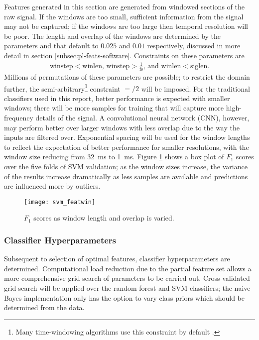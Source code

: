             Features generated in this section are generated from windowed sections of the raw signal. If the windows are too small, sufficient information from the signal may not be captured; if the windows are too large then temporal resolution will be poor. The length and overlap of the windows are determined by the parameters  and  that default to $0.025$ and $0.01$ respectively, discussed in more detail in section \ref{subsec:pl-feats-software}. Constraints on these parameters are 
            \begin{align}
                \text{winstep} < \text{winlen, winstep} > \frac{1}{\text{fs}} \text{, and winlen} < \text{siglen}.
            \end{align}
            Millions of permutations of these parameters are possible; to restrict the domain further, the semi-arbitrary\footnote{Many time-windowing algorithms use this constraint by default \cite{MathWorks,Octave}.} constraint $=$$/2$ will be imposed. For the traditional classifiers used in this report, better performance is expected with smaller windows; there will be more samples for training that will capture more high-frequency details of the signal. A convolutional neural network (CNN), however, may perform better over larger windows with less overlap \cite{Han} due to the way the inputs are filtered over. Exponential spacing will be used for the window lengths to reflect the expectation of better performance for smaller resolutions, with the window size reducing from \SI{32}{\milli\second} to \SI{1}{\milli\second}. Figure \ref{fig:exp-clf-opt-svmfeatwin} shows a box plot of $F_{1}$ scores over the five folds of SVM validation; as the window sizes increase, the variance of the results increase dramatically as less samples are available and predictions are influenced more by outliers. 
            
            \begin{figure}[ht]
                \centering
                \texttt{[image: svm\_featwin]}
                \caption{$F_{1}$ scores as window length and overlap is varied.}
                \label{fig:exp-clf-opt-svmfeatwin}
            \end{figure}
  
        
        \subsubsection{Classifier Hyperparameters}
        \label{subsubsec:exp-clf-opt-param}
            Subsequent to selection of optimal features, classifier hyperparameters are determined. Computational load reduction due to the partial feature set allows a more comprehensive grid search of parameters to be carried out. Cross-validated grid search will be applied over the random forest and SVM classifiers; the naive Bayes implementation only has the option to vary class priors which should be determined from the data.
            
